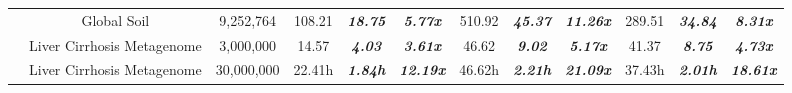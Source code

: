 \documentclass[10pt, conference, compsocconf]{IEEEtran}
\begin{document}
\begin{table}
{\begin{tabular}{|c c c|c c c|c c c|c c c|}
			& Global Soil & 9,252,764 & 108.21 &  \textit{\textbf{18.75}} & \textit{\textbf{5.77x}} & 510.92 & \textit{\textbf{45.37}} & \textit{\textbf{11.26x}} & 289.51 &  \textit{\textbf{34.84}} & \textit{\textbf{8.31x}}\\
			
			& Liver Cirrhosis Metagenome & 3,000,000 & 14.57 &  \textit{\textbf{4.03}} & \textit{\textbf{3.61x}} & 46.62 & \textit{\textbf{9.02}} & \textit{\textbf{5.17x}} & 41.37 &  \textit{\textbf{8.75}} & \textit{\textbf{4.73x}}\\
			
			& Liver Cirrhosis Metagenome & 30,000,000 & 22.41h &  \textit{\textbf{1.84h}} & \textit{\textbf{12.19x}} & 46.62h & \textit{\textbf{2.21h}} & \textit{\textbf{21.09x}} & 37.43h &  \textit{\textbf{2.01h}} & \textit{\textbf{18.61x}}\\		
			
			\hline 
			
		\end{tabular}
	}
\end{table} 
\end{document}
